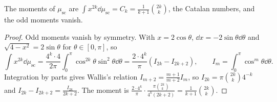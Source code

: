 \begin{lemma}\label{lem:scmoments}
The moments of $\mu_{\mathrm{sc}}$ are $\int x^{2k}\dd\mu_{\mathrm{sc}}=C_k=\frac1{k+1}\binom{2k}k$, the Catalan numbers, and the odd moments vanish.
\end{lemma}
\begin{proof}
Odd moments vanish by symmetry. With $x=2\cos\theta$, $\dd x=-2\sin\theta\dd\theta$ and $\sqrt{4-x^2}=2\sin\theta$ for $\theta\in[0,\pi]$, so
\[
\int x^{2k}\dd\mu_{\mathrm{sc}}=\frac{4^k\cdot4}{2\pi}\int_0^\pi\cos^{2k}\theta\sin^2\theta\dd\theta=\frac{2\cdot4^k}\pi(I_{2k}-I_{2k+2}),\qquad I_m=\int_0^\pi\cos^m\theta\dd\theta.
\]
Integration by parts gives Wallis's relation $I_{m+2}=\frac{m+1}{m+2}I_m$, so $I_{2k}=\pi\binom{2k}k4^{-k}$ and $I_{2k}-I_{2k+2}=\frac{I_{2k}}{2k+2}$. The moment is
$\frac{2\cdot4^k}\pi\cdot\frac{\pi\binom{2k}k}{4^k(2k+2)}=\frac1{k+1}\binom{2k}k$.
\end{proof}

